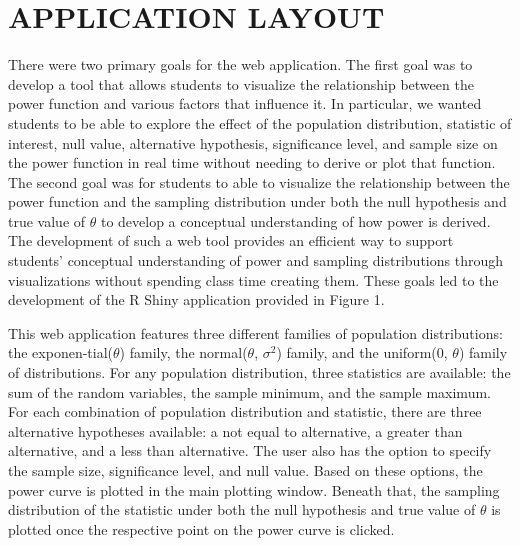\documentclass{TISE}
\begin{document}
\section{APPLICATION LAYOUT}

There were two primary goals for the web application. The first goal was to develop a tool that allows students to visualize the relationship between the power function and various factors that influence it. In particular, we wanted students to be able to explore the effect of the population distribution, statistic of interest, null value, alternative hypothesis, significance level, and sample size on the power function in real time without needing to derive or plot that function. The second goal was for students to able to visualize the relationship between the power function and the sampling distribution under both the null hypothesis and true value of $\theta$ to develop a conceptual understanding of how power is derived. The development of such a web tool provides an efficient way to support students' conceptual understanding of power and sampling distributions through visualizations without spending class time creating them. These goals led to the development of the {\sf R} Shiny application provided in Figure 1. 

This web application features three different families of population distributions: the exponen-tial($\theta$) family, the normal($\theta$, $\sigma^2$) family, and the uniform(0, $\theta$) family of distributions. For any population distribution, three statistics are available: the sum of the random variables, the sample minimum, and the sample maximum. For each combination of population distribution and statistic, there are three alternative hypotheses available: a not equal to alternative, a greater than alternative, and a less than alternative. The user also has the option to specify the sample size, significance level, and null value. Based on these options, the power curve is plotted in the main plotting window. Beneath that, the sampling distribution of the statistic under both the null hypothesis and true value of $\theta$ is plotted once the respective point on the power curve is clicked. 
\end{document}
